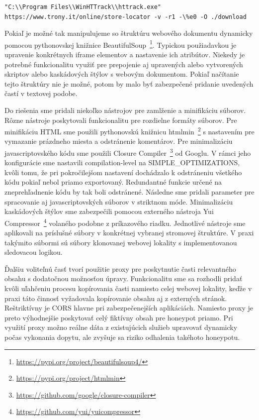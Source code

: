 \documentclass[conference, 11pt,slovak,a4paper,twoside]{IEEEtran}
\begin{document}
\begin{lstlisting}
"C:\\Program Files\\WinHTTrack\\httrack.exe" https://www.trony.it/online/store-locator -v -r1 -\%e0 -O ./download
\end{lstlisting}


Pokiaľ je možné tak manipulujeme so štruktúru webového dokumentu dynamicky pomocou pythonovskej knižnice BeautifulSoup~\footnote{\url{https://pypi.org/project/beautifulsoup4/}}. Typickou použiadavkou je upravenie konkrétnych iframe elementov a nastavenie ich atribútov. Niekedy je potrebné funkcionalitu využiť pre prepojenie aj upravených alebo vytvorených skriptov alebo kaskádových štýlov s webovým dokumentom. Pokiaľ načítanie tejto štruktúry nie je možné, potom by malo byť zabezpečené pridanie uvedených častí v textovej podobe.

Do riešenia sme pridali niekoľko nástrojov pre zamlženie a minifikáciu súborov. Rôzne nástroje poskytovali funkcionalitu pre rozdielne formáty súborov. Pre minifikáciu HTML sme použili pythonovskú knižnicu htmlmin~\footnote{\url{https://pypi.org/project/htmlmin}} s nastavením pre vymazanie prázdneho miesta a odstránenie komentárov. Pre minimalizáciu javascriptovského kódu sme použili Closure Compiler~\footnote{\url{https://github.com/google/closure-compiler}} od Googlu. V rámci jeho konfigurácie sme nastavili compilation-level na SIMPLE\_OPTIMIZATIONS, kvôli tomu, že pri pokročilejšom nastavení dochádzalo k odstráneniu všetkého kódu pokiaľ nebol priamo exportovaný. Redundantné funkcie určené na zneprehľadnenie kódu by tak boli odstránené. Následne sme pridali parameter pre spracovanie aj javascriptovských súborov v striktnom móde. Minimalizáciu kaskádových štýlov sme zabezpečili pomocou externého nástroja Yui Compressor~\footnote{\url{https://github.com/yui/yuicompressor}} volaného podobne z príkazového riadku. Jednotlivé nástroje sme aplikovali na príslušné súbory v konkrétnej vybranej stromovej štruktúre. V praxi takýmito súbormi sú súbory klonovanej webovej lokality s implementovanou sledovacou logikou.

Ďalšiu voliteľnú časť tvorí použitie proxy pre poskytnutie časti relevantného obsahu s dodatočnou možnosťou úpravy. Funkcionalitu sme sa rozhodli pridať kvôli uľahčeniu procesu kopírovania časti namiesto celej webovej lokality, keďže v praxi táto činnosť vyžadovala kopírovanie obsahu aj z externých stránok. Reštriktívny je CORS hlavne pri zabezpečenejších aplikáciách. Namiesto proxy je preto výhodnejšie poskytovať celý fiktívny obsah pre honeypot priamo. Pri využití proxy možno reálne dáta z existujúcich služieb upravovať dynamicky počas vykonania dopytu, ale zvyšuje sa riziko odhalenia takéhoto honeypotu.
\end{document}
